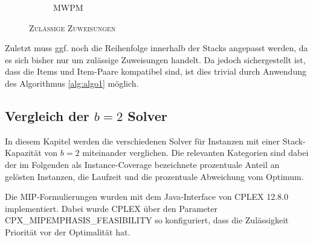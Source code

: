 \begin{figure}[H]
\begin{subfigure}[b]{0.45\textwidth}
  \caption{\textsc{MWPM}}
  \label{fig:mwpm}
\end{subfigure}
\caption{}
\end{figure}

\begin{figure}[H]
  \centering
    \caption{\textsc{Zulässige Zuweisungen}}
    \label{fig:stacking_solution}
\end{figure}

Zuletzt muss ggf. noch die Reihenfolge innerhalb der Stacks angepasst werden, da es sich bisher nur um zulässige Zuweisungen handelt.
Da jedoch sichergestellt ist, dass die Items und Item-Paare kompatibel sind, ist dies trivial durch Anwendung des Algorithmus
\ref{alg:algo1} möglich.

\subsection{Vergleich der $b = 2$ Solver}
\label{sec:solver_comp_b=2}

In diesem Kapitel werden die verschiedenen Solver für Instanzen mit einer Stack-Kapazität von $b=2$ miteinander verglichen.
Die relevanten Kategorien sind dabei der im Folgenden als Instance-Coverage bezeichnete prozentuale Anteil an gelösten Instanzen,
die Laufzeit und die prozentuale Abweichung vom Optimum.

Die MIP-Formulierungen wurden mit dem Java-Interface von CPLEX 12.8.0 implementiert.
Dabei wurde CPLEX über den Parameter \textsc{CPX\_MIPEMPHASIS\_FEASIBILITY} so konfiguriert, dass die Zulässigkeit
Priorität vor der Optimalität hat.\cite{IBM_DOC}


